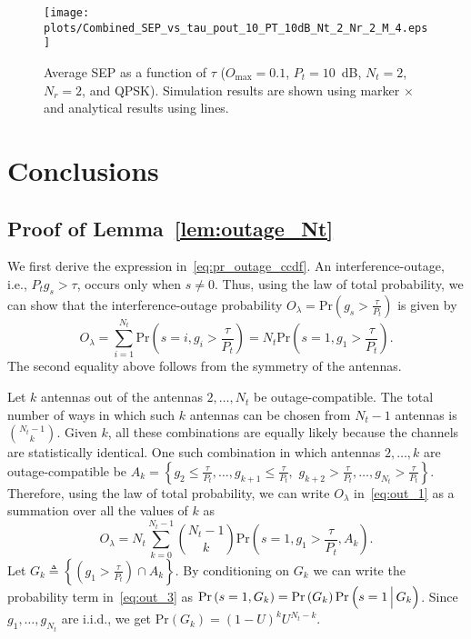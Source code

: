 \documentclass[12pt,draftcls,peerreview,onecolumn]{IEEEtran}
\newcommand{\brac}[1]{\left({#1}\right)}
\newcommand{\define}{\triangleq}
\newcommand{\prob}[1]{\text{Pr}\brac{#1}}
\newcommand{\Given}{\Big\arrowvert}
\newcommand{\nck}[2]{\binom{#1}{#2}}
\newcommand{\setA}{A}
\newcommand{\setAk}{\setA_{k}}
\newcommand{\setG}{G}
\newcommand{\setGk}{\setG_k}
\newcommand{\lam}{\lambda}
\newcommand{\Nt}{{N_t}}
\newcommand{\Nr}{{N_r}}
\newcommand{\Pt}{{P_t}}
\newcommand{\puch}{g}
\newcommand{\gk}[1]{{\puch_{#1}}}
\newcommand{\outmax}{O_{\text{max}}}
\newcommand{\itau}{\tau}
\newcommand{\out}{O}
\newcommand{\taubypt}{\frac{\itau}{\Pt}}
\newcommand{\gkgrtaubypt}[1]{{\gk{#1}}>\taubypt}
\newcommand{\gklttaubypt}[1]{{\gk{#1}}\leq\taubypt}
\newcommand{\un}{U}
\newcommand{\outlam}{\out_{\lam}}
\begin{document}
\begin{figure}
	\centering \texttt{[image: plots/Combined\_SEP\_vs\_tau\_pout\_10\_PT\_10dB\_Nt\_2\_Nr\_2\_M\_4.eps]}
	\caption{Average SEP as a function of $\itau$ ($\outmax=0.1$, $\Pt = 10$~dB, $\Nt = 2$, $\Nr = 2$, and QPSK). Simulation results are shown using marker $\times$ and analytical results using lines.}
	\label{fig:sep_vs_tau_imp_CSI}
\end{figure}




\section{Conclusions}
\label{sec:conclusions}


\appendix
\subsection{Proof of Lemma~\ref{lem:outage_Nt}}
\label{proof:outage_Nt}
We first derive the expression in~\eqref{eq:pr_outage_ccdf}. An interference-outage, i.e., $\Pt \gk{s} > \itau$, occurs only when $s\neq0$. Thus, using the law of total probability, we can show that the interference-outage probability $\outlam = \prob{\gkgrtaubypt{s}}$ is given by
%
\begin{equation}
\outlam =  \sum_{i=1}^{\Nt}\text{Pr}\brac{s=i,\gk{i}>\taubypt}=\Nt\text{Pr}\brac{s=1,\gk{1}>\taubypt}.
\label{eq:out_1}
\end{equation}
%
The second equality above follows from the symmetry of the antennas.

Let $k$ antennas out of the antennas $2,\ldots,\Nt$ be outage-compatible. The total number of ways in which such $k$ antennas can be chosen from $\Nt-1$ antennas is $\nck{\Nt-1}{k}$. Given $k$, all these combinations are equally likely because the channels are statistically identical. One such combination in which antennas $2,\ldots,k$ are outage-compatible be $\setAk=\left\{\gklttaubypt{2},\dots,\gklttaubypt{k+1},\right. $ $\left. \gkgrtaubypt{k+2},\dots,\gkgrtaubypt{\Nt}\right\}$. Therefore, using the law of total probability, we can write $\outlam$ in~\eqref{eq:out_1}  as a summation over all the values of $k$ as
%
\begin{equation}
\outlam =\Nt\sum_{k=0}^{\Nt-1}\nck{\Nt-1}{k} \text{Pr}\brac{s = 1,\gk{1}>\taubypt,\setAk}. 
\label{eq:out_3}
\end{equation}
%
Let $\setGk\define\left\{\left(\gkgrtaubypt{1}\right)\cap\setAk \right\}$. By conditioning on $\setGk$ we can write 
the probability term in~\eqref{eq:out_3} as $ \text{Pr}\brac{s = 1, \setGk} = \text{Pr}\brac{\setGk} \text{Pr}\brac{s = 1\Given \setGk} $.
Since $\gk{1},\ldots,\gk{\Nt}$ are i.i.d., we get $\prob{\setGk} = \left(1-\un\right)^k\un^{\Nt-k}$.
%
\end{document}
